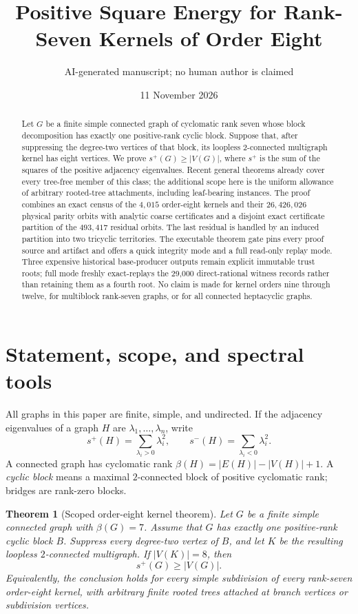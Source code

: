 \documentclass[11pt]{article}
\title{Positive Square Energy for Rank-Seven Kernels of Order Eight}
\author{AI-generated manuscript; no human author is claimed}
\date{11 November 2026}
\newtheorem{theorem}{Theorem}[section]
\theoremstyle{remark}
\newcommand{\splus}{s^+}
\newcommand{\sminus}{s^-}
\begin{document}
\maketitle

\begin{abstract}
Let $G$ be a finite simple connected graph of cyclomatic rank seven whose
block decomposition has exactly one positive-rank cyclic block.  Suppose that,
after suppressing the degree-two vertices of that block, its loopless
$2$-connected multigraph kernel has eight vertices.  We prove
$\splus(G)\geq |V(G)|$, where $\splus$ is the sum of the squares of the
positive adjacency eigenvalues.  Recent general theorems already cover every
tree-free member of this class; the additional scope here is the uniform
allowance of arbitrary rooted-tree attachments, including leaf-bearing
instances.  The proof combines an exact census of the $4{,}015$ order-eight
kernels and their $26{,}426{,}026$ physical parity orbits with analytic coarse
certificates and a disjoint exact certificate partition of the $493{,}417$
residual orbits.  The last residual is handled by an induced partition into two
tricyclic territories.  The executable theorem gate pins every proof source
and artifact and offers a quick integrity mode and a full read-only replay
mode.  Three expensive historical base-producer outputs remain explicit
immutable trust roots; full mode freshly exact-replays the 29,000
direct-rational witness records rather than retaining them as a fourth root.
No claim is made for kernel orders nine through twelve, for multiblock
rank-seven graphs, or for all connected heptacyclic graphs.
\end{abstract}

\section{Statement, scope, and spectral tools}

All graphs in this paper are finite, simple, and undirected.  If the adjacency
eigenvalues of a graph $H$ are $\lambda_1,\ldots,\lambda_n$, write
\[
 \splus(H)=\sum_{\lambda_i>0}\lambda_i^2,
 \qquad
 \sminus(H)=\sum_{\lambda_i<0}\lambda_i^2.
\]
A connected graph has cyclomatic rank
$\beta(H)=|E(H)|-|V(H)|+1$.  A \emph{cyclic block} means a maximal
$2$-connected block of positive cyclomatic rank; bridges are rank-zero blocks.

\begin{theorem}[Scoped order-eight kernel theorem]\label{thm:main}
Let $G$ be a finite simple connected graph with $\beta(G)=7$.  Assume that
$G$ has exactly one positive-rank cyclic block $B$.  Suppress every degree-two
vertex of $B$, and let $K$ be the resulting loopless $2$-connected multigraph.
If $|V(K)|=8$, then
\[
 \boxed{\splus(G)\geq |V(G)|}.
\]
Equivalently, the conclusion holds for every simple subdivision of every
rank-seven order-eight kernel, with arbitrary finite rooted trees attached at
branch vertices or subdivision vertices.
\end{theorem}
\end{document}
